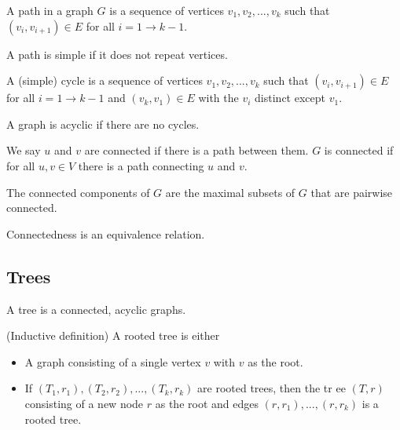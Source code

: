 \begin{definition}
    A path in a graph $G$ is a sequence of vertices $v_1, v_2, ...,
    v_k$ such that $(v_i, v_{i+1}) \in E$ for all $i = 1 \to k - 1$.
\end{definition}

\begin{definition}
    A path is simple if it does not repeat vertices.
\end{definition}

\begin{definition}
    A (simple) cycle is a sequence of vertices $v_1, v_2, ...,
    v_k$ such that $(v_i, v_{i+1}) \in E$ for all $i = 1 \to k -
    1$ and $(v_k, v_1) \in E$ with the $v_i$ distinct except $v_1$.
\end{definition}

\begin{definition}
    A graph is acyclic if there are no cycles.
\end{definition}

\begin{definition}
    We say $u$ and $v$ are connected if there is a path between them.
    $G$ is connected if for all $u, v \in V$ there is a path
    connecting $u$ and $v$.
\end{definition}

\begin{definition}
    The connected components of $G$ are the maximal subsets of $G$
    that are pairwise connected.
\end{definition}

\begin{remark}
    Connectedness is an equivalence relation.
\end{remark}

\subsection{Trees}

\begin{definition}
    A tree is a connected, acyclic graphs.
\end{definition}

\begin{definition}
    (Inductive definition) A rooted tree is either
    \begin{itemize}
        \item A graph consisting of a single vertex $v$ with $v$ as
        the root.
        \item If $(T_1, r_1), (T_2, r_2), ..., (T_k, r_k)$ are rooted
        trees, then the tr ee $(T, r)$ consisting of a new node $r$ as
        the root and edges $(r, r_1), ..., (r, r_k)$ is a rooted tree.
    \end{itemize}
\end{definition}

